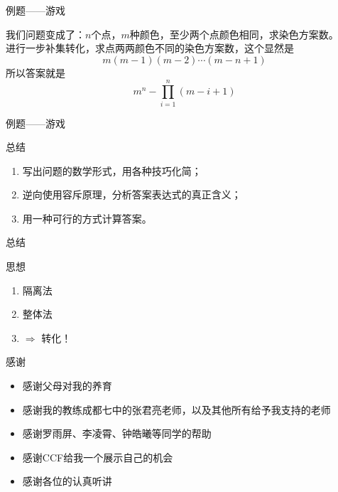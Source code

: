 \documentclass[allowframebreaks,9pt]{beamer}
\begin{document}
\begin{frame}{例题——游戏}

\begin{solution}
我们问题变成了：$n$个点，$m$种颜色，至少两个点颜色相同，求染色方案数。 \\
进行一步{\color{red}补集转化}，求点两两颜色不同的染色方案数，这个显然是
\[
m(m-1)(m-2)\cdots(m-n+1)
\]
所以答案就是
\[
m^n - \prod_{i = 1}^{n} (m - i + 1)
\]
\end{solution}

\end{frame}

\begin{frame}{例题——游戏}

\begin{block}{总结}
\begin{enumerate}
\item 写出问题的数学形式，用各种技巧化简；
\item {\color{red}逆向}使用容斥原理，分析答案表达式的真正含义；
\item 用一种可行的方式计算答案。
\end{enumerate}
\end{block}

\end{frame}

\begin{frame}{总结}

\begin{block}{思想}

\begin{enumerate}
\item {\color{red}隔离法}
\item {\color{red}整体法}

\pause

\item {\color{red} $\Rightarrow$ 转化！}
\end{enumerate}

\end{block}

\end{frame}

\begin{frame}{感谢}

\begin{itemize}
\item 感谢父母对我的养育
\item 感谢我的教练成都七中的张君亮老师，以及其他所有给予我支持的老师
\item 感谢罗雨屏、李凌霄、钟皓曦等同学的帮助
\item 感谢CCF给我一个展示自己的机会
\item 感谢各位的认真听讲
\end{itemize}

\end{frame}
\end{document}
